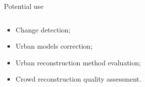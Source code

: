 \documentclass[10pt, export]{beamer}
\begin{document}
        \begin{frame}{Potential use}
            \begin{minipage}[0.2\textheight]{\textwidth}
                \begin{columns}[T]
                    \begin{column}{0.48\textwidth}
                        \begin{itemize}[label=$\blacktriangleright$, font=\color{IGNGreen}, itemsep=2em]
                            \item<1-> Change detection;
                            \item<2-> Urban models correction;
                            \item<3-> Urban reconstruction method evaluation;
                            \item<4-> Crowd reconstruction quality assessment.
                        \end{itemize}
                    \end{column}
                    \begin{column}{0.48\textwidth}
\end{column}
\end{columns}
\end{minipage}
\end{frame}
\end{document}
